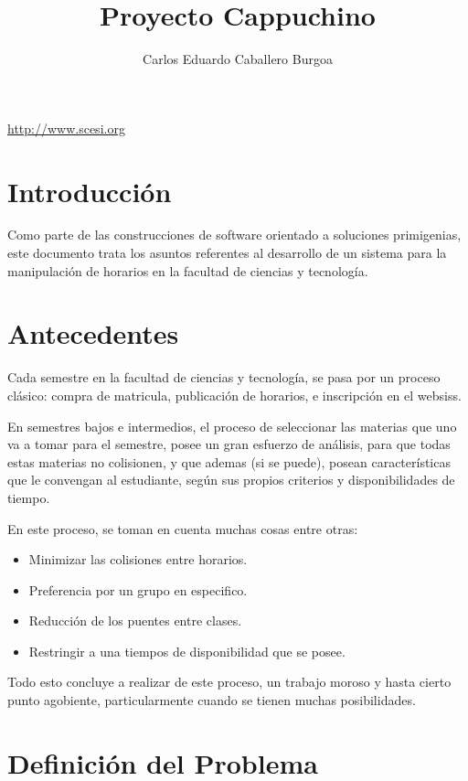 \documentclass[letter,12pt]{article}
\title{\bf Proyecto Cappuchino}
\author{Carlos Eduardo Caballero Burgoa}
\begin{document}
\maketitle
\begin{center}\url {http://www.scesi.org}\end{center}
\pagebreak

\tableofcontents
\pagebreak

\section{Introducción}
Como parte de las construcciones de software orientado a soluciones primigenias, este documento
trata los asuntos referentes al desarrollo de un sistema para la manipulación de horarios en
la facultad de ciencias y tecnología.

\section{Antecedentes}
Cada semestre en la facultad de ciencias y tecnología, se pasa por un proceso clásico: compra de
matricula, publicación de horarios, e inscripción en el websiss.

En semestres bajos e intermedios, el proceso de seleccionar las materias que uno va a tomar para
el semestre, posee un gran esfuerzo de análisis, para que todas estas materias no colisionen, y que
ademas (si se puede), posean características que le convengan al estudiante, según sus propios criterios
y disponibilidades de tiempo.

En este proceso, se toman en cuenta muchas cosas entre otras:

\begin{itemize}
\item Minimizar las colisiones entre horarios.
\item Preferencia por un grupo en especifico.
\item Reducción de los puentes entre clases.
\item Restringir a una tiempos de disponibilidad que se posee.
\end{itemize}

Todo esto concluye a realizar de este proceso, un trabajo moroso y hasta cierto punto agobiente,
particularmente cuando se tienen muchas posibilidades.

\section{Definición del Problema}
\end{document}
